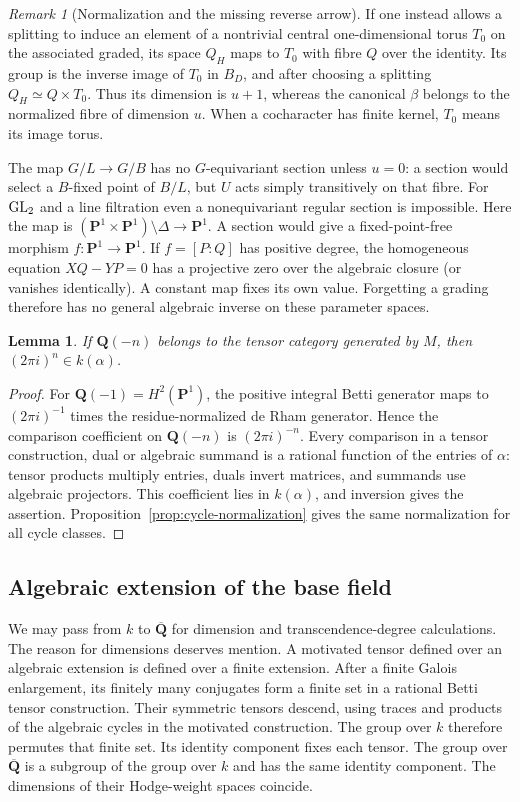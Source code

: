\documentclass[11pt]{article}
\newtheorem{lemma}[theorem]{Lemma}
\theoremstyle{definition}\newtheorem{definition}[theorem]{Definition}
\theoremstyle{remark}\newtheorem{remark}[theorem]{Remark}
\newcommand{\Q}{\mathbf Q}\newcommand{\Z}{\mathbf Z}
\newcommand{\Qb}{\overline{\mathbf Q}}\newcommand{\Fp}{\mathbf F_p}
\begin{document}
\begin{remark}[Normalization and the missing reverse arrow]\label{rem:normalized-torsor}
If one instead allows a splitting to induce an element of a nontrivial central one-dimensional torus $T_0$ on the associated graded, its space $Q_H$ maps to $T_0$ with fibre $Q$ over the identity. Its group is the inverse image of $T_0$ in $B_D$, and after choosing a splitting $Q_H\simeq Q\times T_0$. Thus its dimension is $u+1$, whereas the canonical $\beta$ belongs to the normalized fibre of dimension $u$. When a cocharacter has finite kernel, $T_0$ means its image torus.

The map $G/L\to G/B$ has no $G$-equivariant section unless $u=0$: a section would select a $B$-fixed point of $B/L$, but $U$ acts simply transitively on that fibre. For $\operatorname{GL}_2$ and a line filtration even a nonequivariant regular section is impossible. Here the map is $(\mathbf P^1\times\mathbf P^1)\setminus\Delta\to\mathbf P^1$. A section would give a fixed-point-free morphism $f:\mathbf P^1\to\mathbf P^1$. If $f=[P:Q]$ has positive degree, the homogeneous equation $XQ-YP=0$ has a projective zero over the algebraic closure (or vanishes identically). A constant map fixes its own value. Forgetting a grading therefore has no general algebraic inverse on these parameter spaces.
\end{remark}

\begin{lemma}\label{lem:tate-membership}
If $\Q(-n)$ belongs to the tensor category generated by $M$, then $(2\pi i)^n\in k(\alpha)$.
\end{lemma}
\begin{proof}
For $\Q(-1)=H^2(\mathbf P^1)$, the positive integral Betti generator maps to $(2\pi i)^{-1}$ times the residue-normalized de Rham generator. Hence the comparison coefficient on $\Q(-n)$ is $(2\pi i)^{-n}$. Every comparison in a tensor construction, dual or algebraic summand is a rational function of the entries of $\alpha$: tensor products multiply entries, duals invert matrices, and summands use algebraic projectors. This coefficient lies in $k(\alpha)$, and inversion gives the assertion. Proposition~\ref{prop:cycle-normalization} gives the same normalization for all cycle classes.
\end{proof}

\subsection{Algebraic extension of the base field}
We may pass from $k$ to $\Qb$ for dimension and transcendence-degree calculations. The reason for dimensions deserves mention. A motivated tensor defined over an algebraic extension is defined over a finite extension. After a finite Galois enlargement, its finitely many conjugates form a finite set in a rational Betti tensor construction. Their symmetric tensors descend, using traces and products of the algebraic cycles in the motivated construction. The group over $k$ therefore permutes that finite set. Its identity component fixes each tensor. The group over $\Qb$ is a subgroup of the group over $k$ and has the same identity component. The dimensions of their Hodge-weight spaces coincide.
\end{document}
